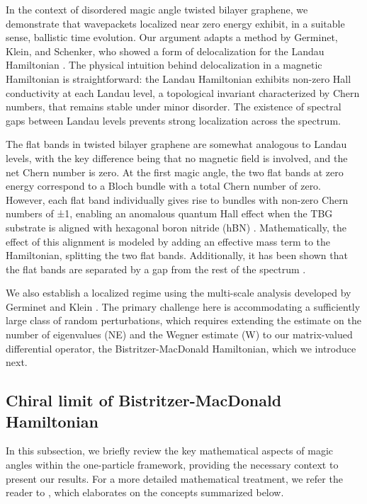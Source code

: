 \documentclass[reqno,12pt,letterpaper]{amsart}
\numberwithin{equation}{section}
\begin{document}
In the context of disordered magic angle twisted bilayer graphene, we demonstrate that wavepackets localized near zero energy exhibit, in a suitable sense, ballistic time evolution. Our argument adapts a method by Germinet, Klein, and Schenker, who showed a form of delocalization for the Landau Hamiltonian \cite{GKS}. The physical intuition behind delocalization in a magnetic Hamiltonian is straightforward: the Landau Hamiltonian exhibits non-zero Hall conductivity at each Landau level, a topological invariant characterized by Chern numbers, that remains stable under minor disorder. The existence of spectral gaps between Landau levels prevents strong localization across the spectrum.

The flat bands in twisted bilayer graphene are somewhat analogous to Landau levels, with the key difference being that no magnetic field is involved, and the net Chern number is zero. At the first magic angle, the two flat bands at zero energy correspond to a Bloch bundle with a total Chern number of zero. However, each flat band individually gives rise to bundles with non-zero Chern numbers of ±1, enabling an anomalous quantum Hall effect when the TBG substrate is aligned with hexagonal boron nitride (hBN) \cite{Li21}. Mathematically, the effect of this alignment is modeled by adding an effective mass term to the Hamiltonian, splitting the two flat bands. Additionally, it has been shown that the flat bands are separated by a gap from the rest of the spectrum \cite{bhz2,bhz4}.

We also establish a localized regime using the multi-scale analysis developed by Germinet and Klein \cite{GK01,GK02}. The primary challenge here is accommodating a sufficiently large class of random perturbations, which requires extending the estimate on the number of eigenvalues (NE) and the Wegner estimate (W) to our matrix-valued differential operator, the Bistritzer-MacDonald Hamiltonian, which we introduce next.


\subsection{Chiral limit of Bistritzer-MacDonald Hamiltonian}
\label{subsec:chiral_limit}
In this subsection, we briefly review the key mathematical aspects of magic angles within the one-particle framework, providing the necessary context to present our results. For a more detailed mathematical treatment, we refer the reader to \cite[Section 3]{dynip}, which elaborates on the concepts summarized below.
\end{document}
